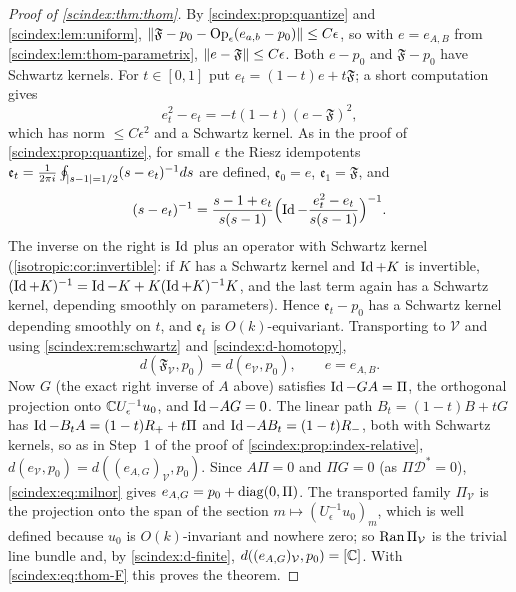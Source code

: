 \begin{proof}[Proof of \cref{scindex:thm:thom}]
  By \cref{scindex:prop:quantize} and \cref{scindex:lem:uniform},
  $\lVert \mathfrak F-p_0-\operatorname{Op}_\epsilon(e_{a,b}-p_0)\rVert\le C\epsilon$, so with $e=e_{A,B}$ from
  \cref{scindex:lem:thom-parametrix}, $\lVert e-\mathfrak F\rVert\le C\epsilon$. Both
  $e-p_0$ and $\mathfrak F-p_0$ have Schwartz kernels. For $t\in[0,1]$ put
  $e_t=(1-t)e+t\mathfrak F$; a short computation gives
  \begin{equation*}
    e_t^2-e_t=-t(1-t)(e-\mathfrak F)^2,
  \end{equation*}
  which has norm $\le C\epsilon^2$ and a Schwartz kernel. As in the proof of
  \cref{scindex:prop:quantize}, for small $\epsilon$ the Riesz idempotents
  $\mathfrak e_t=\frac1{2\pi i}\oint_{\lvert s-1\rvert=1/2}(s-e_t)^{-1}ds$ are defined,
  $\mathfrak e_0=e$, $\mathfrak e_1=\mathfrak F$, and
  \begin{equation*}
    (s-e_t)^{-1}=\frac{s-1+e_t}{s(s-1)}\Bigl(\operatorname{Id}-\frac{e_t^2-e_t}{s(s-1)}
    \Bigr)^{-1}.
  \end{equation*}
  The inverse on the right is $\operatorname{Id}$ plus an operator with Schwartz kernel
  (\cref{isotropic:cor:invertible}: if $K$ has a Schwartz kernel and $\operatorname{Id}+K$ is invertible,
  $(\operatorname{Id}+K)^{-1}=\operatorname{Id}-K+K(\operatorname{Id}+K)^{-1}K$, and the last term again has a Schwartz kernel,
  depending smoothly on parameters). Hence $\mathfrak e_t-p_0$ has a Schwartz
  kernel depending smoothly on $t$, and $\mathfrak e_t$ is $O(k)$-equivariant.
  Transporting to $\mathcal V$ and using \cref{scindex:rem:schwartz} and
  \ref{scindex:d-homotopy},
  \begin{equation*}
    d(\mathfrak F_{\mathcal V},p_0)=d(e_{\mathcal V},p_0),\qquad e=e_{A,B}.
  \end{equation*}
  Now $G$ (the exact right inverse of $A$ above) satisfies $\operatorname{Id}-GA=\Pi$, the
  orthogonal projection onto $\mathbb{C} U_\epsilon^{-1}u_0$, and $\operatorname{Id}-AG=0$. The
  linear path $B_t=(1-t)B+tG$ has $\operatorname{Id}-B_tA=(1-t)R_++t\Pi$ and $\operatorname{Id}-AB_t=
  (1-t)R_-$, both with Schwartz kernels, so as in Step~1 of the proof of
  \cref{scindex:prop:index-relative}, $d(e_{\mathcal V},p_0)=
  d((e_{A,G})_{\mathcal V},p_0)$. Since $A\Pi=0$ and $\Pi G=0$ (as
  $\Pi\mathcal D^*=0$), \eqref{scindex:eq:milnor} gives $e_{A,G}=p_0+
  \operatorname{diag}(0,\Pi)$. The transported family $\Pi_{\mathcal V}$ is the projection onto
  the span of the section $m\mapsto(U_\epsilon^{-1}u_0)_m$, which is well defined
  because $u_0$ is $O(k)$-invariant and nowhere zero; so $\operatorname{Ran}\Pi_{\mathcal V}$ is
  the trivial line bundle and, by \ref{scindex:d-finite}, $d((e_{A,G})_{\mathcal V},
  p_0)=[\mathbb{C}]$. With \eqref{scindex:eq:thom-F} this proves the theorem.
\end{proof}

